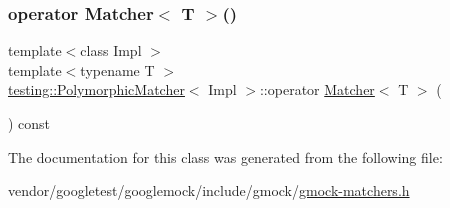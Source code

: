 \subsubsection{\texorpdfstring{operator Matcher$<$ T $>$()}{operator Matcher< T >()}}
{\footnotesize\ttfamily template$<$class Impl $>$ \\
template$<$typename T $>$ \\
\hyperlink{classtesting_1_1_polymorphic_matcher}{testing\+::\+Polymorphic\+Matcher}$<$ Impl $>$\+::operator \hyperlink{classtesting_1_1_matcher}{Matcher}$<$ T $>$ (\begin{DoxyParamCaption}{ }\end{DoxyParamCaption}) const\hspace{0.3cm}{\ttfamily [inline]}}



The documentation for this class was generated from the following file\+:\begin{DoxyCompactItemize}
\item 
vendor/googletest/googlemock/include/gmock/\hyperlink{gmock-matchers_8h}{gmock-\/matchers.\+h}\end{DoxyCompactItemize}
